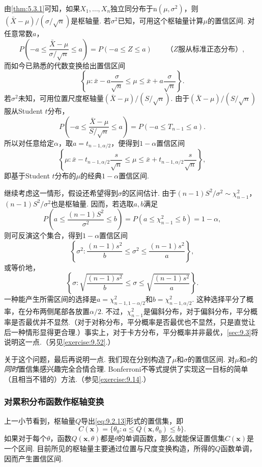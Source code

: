 \begin{example}[正态枢轴区间]\label{ex:9.2.10}
由\autoref{thm:5.3.1}可知，如果$X_1,\ldots,X_n$独立同分布于$\mathrm n(\mu,\sigma^2)$，则$(\bar X-\mu)/(\sigma/\sqrt n)$是枢轴量. 若$\sigma^2$已知，可用这个枢轴量计算$\mu$的置信区间. 对任意常数$a$，
$$P\left(-a\le\frac{\bar X-\mu}{\sigma/\sqrt n}\le a\right)=P(-a\le Z\le a)\qquad\text{（$Z$服从标准正态分布）},$$
而如今已熟悉的代数变换给出置信区间
$$\left\{\mu:\bar x-a\frac\sigma{\sqrt n}\le\mu\le\bar x+a\frac\sigma{\sqrt n}\right\}.$$
若$\sigma^2$未知，可用位置尺度枢轴量$(\bar X-\mu)/(S/\sqrt n)$. 由于$(\bar X-\mu)/(S/\sqrt n)$服从Student $t$分布，
$$P\left(-a\le\frac{\bar X-\mu}{S/\sqrt n}\le a\right)=P(-a\le T_{n-1}\le a).$$
所以对任意给定$\alpha$，取$a=t_{n-1,\alpha/2}$，便得到$1-\alpha$置信区间
\begin{equation}\label{eq:9.2.14}
\left\{\mu:\bar x-t_{n-1,\alpha/2}\frac s{\sqrt n}\le\mu\le\bar x+t_{n-1,\alpha/2}\frac s{\sqrt n}\right\},
\end{equation}
即基于Student $t$分布的$\mu$的经典$1-\alpha$置信区间.

继续考虑这一情形，假设还希望得到$\sigma$的区间估计. 由于$(n-1)S^2/\sigma^2\sim\chi^2_{n-1}$，$(n-1)S^2/\sigma^2$也是枢轴量. 因而，若选取$a,b$满足
$$P\left(a\le\frac{(n-1)S^2}{\sigma^2}\le b\right)=P(a\le\chi^2_{n-1}\le b)=1-\alpha,$$
则可反演这个集合，得到$1-\alpha$置信区间
$$\left\{\sigma^2:\frac{(n-1)s^2}b\le\sigma^2\le\frac{(n-1)s^2}a\right\},$$
或等价地，
$$\left\{\sigma:\sqrt{\frac{(n-1)s^2}b}\le\sigma\le\sqrt{\frac{(n-1)s^2}a}\right\}.$$
一种能产生所需区间的选择是$a=\chi^2_{n-1,1-\alpha/2}$和$b=\chi^2_{n-1,\alpha/2}$. 这种选择平分了概率，在分布两侧尾部各放置$\alpha/2$. 不过，$\chi^2_{n-1}$是偏斜分布，对于偏斜分布，平分概率是否最优并不显然.（对于对称分布，平分概率是否最优也不显然，只是直觉让后一种情形显得更合理.）事实上，对于卡方分布，平分概率并非最优，\autoref{sec:9.3}将说明这一点.（另见\autoref{exercise:9.52}.）

关于这个问题，最后再说明一点. 我们现在分别构造了$\mu$和$\sigma$的置信区间. 对$\mu$和$\sigma$的\emph{同时}置信集感兴趣完全合情合理. Bonferroni不等式提供了实现这一目标的简单（且相当不错的）方法.（参见\autoref{exercise:9.14}.）
\end{example}
\subsubsection{对累积分布函数作枢轴变换}\label{sec:9.2.3}
上一小节看到，枢轴量$Q$导出\eqref{eq:9.2.13}形式的置信集，即
$$C(\boldsymbol x)=\{\theta_0:a\le Q(\boldsymbol x,\theta_0)\le b\}.$$
如果对于每个$\theta$，函数$Q(\boldsymbol x,\theta)$都是$\theta$的单调函数，那么就能保证置信集$C(\boldsymbol x)$是一个区间. 目前所见的枢轴量主要通过位置与尺度变换构造，所得的$Q$函数单调，因而产生置信区间.

